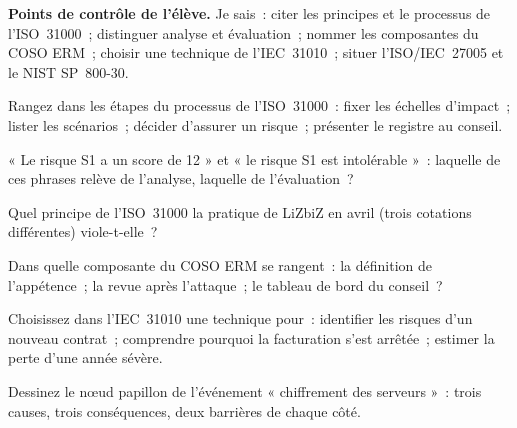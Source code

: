 \begin{boxinfo}
\textbf{Points de contrôle de l'élève.} Je sais~: citer les principes et le
processus de l'ISO~31000~; distinguer analyse et évaluation~; nommer les
composantes du COSO ERM~; choisir une technique de l'IEC~31010~; situer
l'ISO/IEC~27005 et le NIST SP~800-30.
\end{boxinfo}

\bigskip

\begin{boxexo}[title={\ding{45}\quad Exercice~4.1. Le processus \niveaubase}]
Rangez dans les étapes du processus de l'ISO~31000~: fixer les échelles
d'impact~; lister les scénarios~; décider d'assurer un risque~; présenter le
registre au conseil.
\end{boxexo}

\begin{boxexo}[title={\ding{45}\quad Exercice~4.2. Analyser ou évaluer \niveaubase}]
« Le risque S1 a un score de 12 » et « le risque S1 est intolérable »~:
laquelle de ces phrases relève de l'analyse, laquelle de l'évaluation~?
\end{boxexo}

\begin{boxexo}[title={\ding{45}\quad Exercice~4.3. Principes \niveaubase}]
Quel principe de l'ISO~31000 la pratique de LiZbiZ en avril (trois
cotations différentes) viole-t-elle~?
\end{boxexo}

\begin{boxexo}[title={\ding{45}\quad Exercice~4.4. COSO \niveaumoyen}]
Dans quelle composante du COSO ERM se rangent~: la définition de
l'appétence~; la revue après l'attaque~; le tableau de bord du conseil~?
\end{boxexo}

\begin{boxexo}[title={\ding{45}\quad Exercice~4.5. Choisir une technique \niveaumoyen}]
Choisissez dans l'IEC~31010 une technique pour~: identifier les risques
d'un nouveau contrat~; comprendre pourquoi la facturation s'est arrêtée~;
estimer la perte d'une année sévère.
\end{boxexo}

\begin{boxexo}[title={\ding{45}\quad Exercice~4.6. Nœud papillon \niveaumoyen}]
Dessinez le nœud papillon de l'événement « chiffrement des serveurs »~:
trois causes, trois conséquences, deux barrières de chaque côté.
\end{boxexo}

